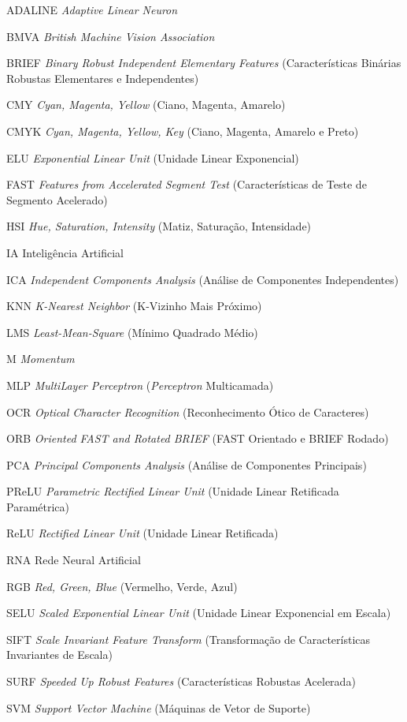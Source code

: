 \documentclass[12pt,oneside,a4paper,chapter=TITLE,section=TITLE,sumario
		=tradicional]{abntex2}
\begin{document}
		\begin{siglas}
		  \item[ADALINE] 	\textit{Adaptive Linear Neuron}
		  \item[BMVA] 		\textit{British Machine Vision Association}
		  \item[BRIEF] 		\textit{Binary Robust Independent Elementary Features} (Características Binárias Robustas Elementares e Independentes)
		  \item[CMY] 		\textit{Cyan, Magenta, Yellow} (Ciano, Magenta, Amarelo)
		  \item[CMYK] 		\textit{Cyan, Magenta, Yellow, Key} (Ciano, Magenta, Amarelo e Preto)	
		  \item[ELU] 		\textit{Exponential Linear Unit} (Unidade Linear Exponencial)	  
		  \item[FAST] 		\textit{Features from Accelerated Segment Test} (Características de Teste de Segmento Acelerado)
		  \item[HSI] 		\textit{Hue, Saturation, Intensity} (Matiz, Saturação, Intensidade)
		  \item[IA] 		Inteligência Artificial
		  \item[ICA] 		\textit{Independent Components Analysis} (Análise de Componentes Independentes)
		  \item[KNN] 		\textit{K-Nearest Neighbor} (K-Vizinho Mais Próximo)
		  \item[LMS] 		\textit{Least-Mean-Square} (Mínimo Quadrado Médio)
		  \item[M] 			\textit{Momentum}		  
		  \item[MLP] 		\textit{MultiLayer Perceptron} (\textit{Perceptron} Multicamada)
		  \item[OCR] 		\textit{Optical Character Recognition} (Reconhecimento Ótico de Caracteres)
		  \item[ORB] 		\textit{Oriented FAST and Rotated BRIEF} (FAST Orientado e BRIEF Rodado)
		  \item[PCA] 		\textit{Principal Components Analysis} (Análise de Componentes Principais)
		  \item[PReLU] 		\textit{Parametric Rectified Linear Unit} (Unidade Linear Retificada Paramétrica)
		  \item[ReLU] 		\textit{Rectified Linear Unit} (Unidade Linear Retificada)
		  \item[RNA] 		Rede Neural Artificial	  
		  \item[RGB] 		\textit{Red, Green, Blue} (Vermelho, Verde, Azul)
		  \item[SELU] 		\textit{Scaled Exponential Linear Unit} (Unidade Linear Exponencial em Escala)
		  \item[SIFT] 		\textit{Scale Invariant Feature Transform} (Transformação de Características Invariantes de Escala)
		  \item[SURF] 		\textit{Speeded Up Robust Features} (Características Robustas Acelerada)
		  \item[SVM] 		\textit{Support Vector Machine} (Máquinas de Vetor de Suporte)
		\end{siglas}
\end{document}

